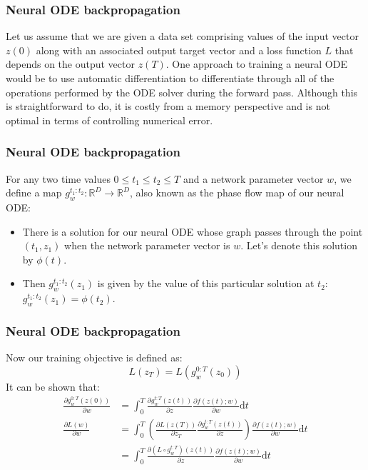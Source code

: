 \documentclass{beamer}
\begin{document}
\begin{frame}
    \frametitle{Neural ODE backpropagation}
    Let us assume that we are given a data set comprising values of the input vector $z(0)$ along with an associated output target vector and a loss function $L$ that depends on the output vector $z(T)$.
    \bigbreak
    One approach to training a neural ODE would be to use automatic differentiation to differentiate through all of the operations performed by the ODE solver during the forward pass. Although this is straightforward to do, it is costly from a memory perspective and is not optimal in terms of controlling numerical error.
\end{frame}

\begin{frame}
    \frametitle{Neural ODE backpropagation}
    For any two time values $0\le{}t_{1}\le{}t_{2}\le{}T$ and a network parameter vector $w$, we define a map $g^{t_{1}:t_{2}}_{w}:\mathbb{R}^{D}\to\mathbb{R}^{D}$, also known as the phase flow map of our neural ODE:
    \begin{itemize}
        \item There is a solution for our neural ODE whose graph passes through the point $(t_{1},z_{1})$ when the network parameter vector is $w$. Let's denote this solution by $\phi(t)$.
        \item Then $g^{t_{1}:t_{2}}_{w}(z_{1})$ is given by the value of this particular solution at $t_{2}$: $g^{t_{1}:t_{2}}_{w}(z_{1})=\phi(t_{2})$.
    \end{itemize}
\end{frame}

\begin{frame}
    \frametitle{Neural ODE backpropagation}
    Now our training objective is defined as:
    \begin{equation*}
        L(z_{T})=L(g^{0:T}_{w}(z_{0}))
    \end{equation*}
    It can be shown that:
    \begin{align*}
        \frac{\partial{}g^{0:T}_{w}(z(0))}{\partial{}w}&=\int_{0}^{T}\frac{\partial{}g^{t:T}_{w}(z(t))}{\partial{}z}\frac{\partial{}f(z(t);w)}{\partial{}w}\mathrm{d}t \\
        \frac{\partial{}L(w)}{\partial{}w}&=\int_{0}^{T}(\frac{\partial{}L(z(T))}{\partial{}z_{T}}\frac{\partial{}g^{t:T}_{w}(z(t))}{\partial{}z})\frac{\partial{}f(z(t);w)}{\partial{}w}\mathrm{d}t \\
        &=\int_{0}^{T}\frac{\partial{}(L\circ{}g^{t:T}_{w})(z(t))}{\partial{}z}\frac{\partial{}f(z(t);w)}{\partial{}w}\mathrm{d}t
    \end{align*}
\end{frame}
\end{document}

